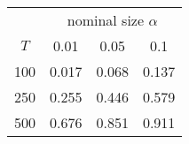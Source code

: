% 
\begin{tabular}{cccc}
  \hline
  & \multicolumn{3}{c}{nominal size $\alpha$} \\
 $T$ & 0.01 & 0.05 & 0.1 \\
 \hline
100 & 0.017 & 0.068 & 0.137 \\ 
  250 & 0.255 & 0.446 & 0.579 \\ 
  500 & 0.676 & 0.851 & 0.911 \\ 
   \hline
\end{tabular}
